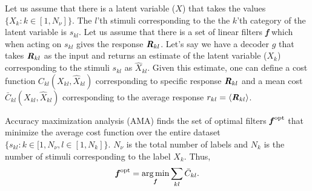 \documentclass{jov}
\DeclareMathOperator*{\argmin}{arg\,min}
\begin{document}
Let us assume that there is a latent variable ($X$) that takes the values $\{X_k: k\in[1,N_{\nu}] \}$. The $l$'th stimuli corresponding to the the $k$'th category of the latent variable is $s_{kl}$. Let us assume that there is a set of linear filters {\textbf{\textit f}} which when acting on $s_{kl}$ gives the response ${\textbf{\textit R}}_{kl}$. Let's say we have a decoder $g$ that takes ${\textbf{\textit R}}_{kl}$ as the input and returns an estimate of the latent variable ($X_k$) corresponding to the stimuli $s_{kl}$ as $\hat{X}_{kl}$. Given this estimate, one can define a cost function $C_{kl}(X_{kl},\hat{X}_{kl})$ corresponding to specific response ${\textbf{\textit R}}_{kl}$ and a mean cost $\bar{C}_{kl}(X_{kl},\hat{X}_{kl})$ corresponding to the average response $r_{kl} = \langle{\textbf{\textit R}}_{kl}\rangle$. 

Accuracy maximization analysis (AMA) finds the set of optimal filters ${\textbf{\textit f}}^{\rm opt}$ that minimize the average cost function over the entire dataset $\{s_{kl}: k\in[1,N_{\nu}, l\in[1,N_k]\}$. $N_{\nu}$ is the total number of labels and $N_{k}$ is the number of stimuli corresponding to the label $X_k$. Thus,
\begin{align}
{\textbf {\textit f} }^{\rm opt} = \argmin_{\textbf {\textit f} } \sum_{kl} \bar{C}_{kl}.
\label{eq:fopt}
\end{align}
\end{document}
